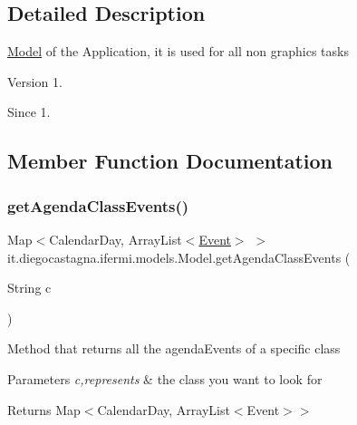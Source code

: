 \subsection{Detailed Description}
\mbox{\hyperlink{classit_1_1diegocastagna_1_1ifermi_1_1models_1_1_model}{Model}} of the Application, it is used for all non graphics tasks \begin{DoxyVersion}{Version}
1. 
\end{DoxyVersion}
\begin{DoxySince}{Since}
1. 
\end{DoxySince}


\subsection{Member Function Documentation}
\mbox{\label{classit_1_1diegocastagna_1_1ifermi_1_1models_1_1_model_a5abb79b8ecbe8030caf5d08ced00c330}} 
\subsubsection{\texorpdfstring{getAgendaClassEvents()}{getAgendaClassEvents()}}
{\footnotesize\ttfamily Map$<$Calendar\+Day, Array\+List$<$\mbox{\hyperlink{classit_1_1diegocastagna_1_1ifermi_1_1utils_1_1_event}{Event}}$>$ $>$ it.\+diegocastagna.\+ifermi.\+models.\+Model.\+get\+Agenda\+Class\+Events (\begin{DoxyParamCaption}\item[{String}]{c }\end{DoxyParamCaption})\hspace{0.3cm}{\ttfamily [inline]}}

Method that returns all the agenda\+Events of a specific class 
\begin{DoxyParams}{Parameters}
{\em c,represents} & the class you want to look for \\
\hline
\end{DoxyParams}
\begin{DoxyReturn}{Returns}
Map$<$Calendar\+Day, Array\+List$<$\+Event$>$$>$ 
\end{DoxyReturn}
\mbox{\label{classit_1_1diegocastagna_1_1ifermi_1_1models_1_1_model_ac1febcd79ed68035cea3411b15c9872c}} 

